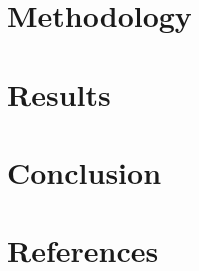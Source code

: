 \documentclass[12pt]{article}
\begin{document}
\newpage

\section{Methodology}

\newpage

\section{Results}

\newpage

\section{Conclusion}

\newpage

\section{References}
\nocite{*}


\end{document}
